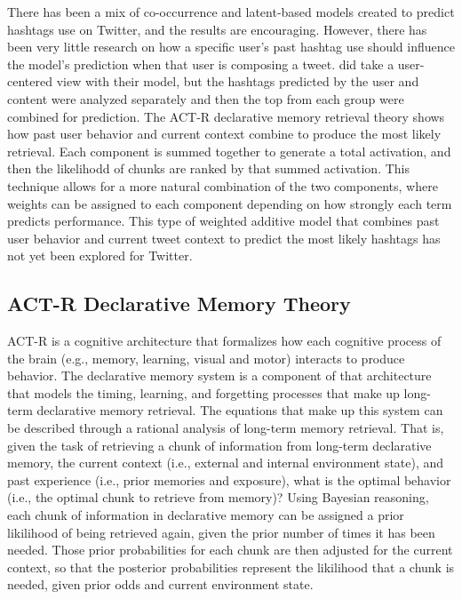 \documentclass[man,floatsintext]{apa6}
\begin{document}
There has been a mix of co-occurrence and latent-based models created to predict hashtags use on Twitter, and the results are encouraging.
However, there has been very little research on how a specific user's past hashtag use should influence the model's prediction when that user is composing a tweet.
\textcite{Kywe2012} did take a user-centered view with their model, but the hashtags predicted by the user and content were analyzed separately and then the top from each group were combined for prediction.
The ACT-R declarative memory retrieval theory shows how past user behavior and current context combine to produce the most likely retrieval.
Each component is summed together to generate a total activation, and then the likelihodd of chunks are ranked by that summed activation.
This technique allows for a more natural combination of the two components, where weights can be assigned to each component depending on how strongly each term predicts performance.
This type of weighted additive model that combines past user behavior and current tweet context to predict the most likely hashtags has not yet been explored for Twitter.

\subsection{ACT-R Declarative Memory Theory}

ACT-R \parencite{Anderson2004} is a cognitive architecture that formalizes how each cognitive process of the brain (e.g., memory, learning, visual and motor) interacts to produce behavior.
The declarative memory system is a component of that architecture that models the timing, learning, and forgetting processes that make up long-term declarative memory retrieval.
The equations that make up this system can be described through a rational analysis of long-term memory retrieval.
That is, given the task of retrieving a chunk of information from long-term declarative memory,
the current context (i.e., external and internal environment state), and past experience (i.e., prior memories and exposure), 
what is the optimal behavior (i.e., the optimal chunk to retrieve from memory)?
Using Bayesian reasoning, each chunk of information in declarative memory can be assigned a prior likilihood of being retrieved again, given the prior number of times it has been needed.
Those prior probabilities for each chunk are then adjusted for the current context, so that the posterior probabilities represent the likilihood that a chunk is needed, given prior odds and current environment state.
\end{document}
